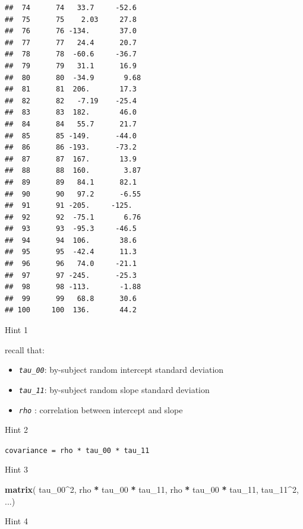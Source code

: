 \documentclass[]{book}
\newenvironment{Shaded}{\begin{snugshade}}{\end{snugshade}}
\newcommand{\DataTypeTok}[1]{\textcolor[rgb]{0.13,0.29,0.53}{#1}}
\newcommand{\DecValTok}[1]{\textcolor[rgb]{0.00,0.00,0.81}{#1}}
\newcommand{\KeywordTok}[1]{\textcolor[rgb]{0.13,0.29,0.53}{\textbf{#1}}}
\newcommand{\NormalTok}[1]{#1}
\newcommand{\OperatorTok}[1]{\textcolor[rgb]{0.81,0.36,0.00}{\textbf{#1}}}
\newcommand{\StringTok}[1]{\textcolor[rgb]{0.31,0.60,0.02}{#1}}
\providecommand{\tightlist}{%
  \setlength{\itemsep}{0pt}\setlength{\parskip}{0pt}}
\begin{document}
\begin{verbatim}
##  74      74   33.7     -52.6  
##  75      75    2.03     27.8  
##  76      76 -134.       37.0  
##  77      77   24.4      20.7  
##  78      78  -60.6     -36.7  
##  79      79   31.1      16.9  
##  80      80  -34.9       9.68 
##  81      81  206.       17.3  
##  82      82   -7.19    -25.4  
##  83      83  182.       46.0  
##  84      84   55.7      21.7  
##  85      85 -149.      -44.0  
##  86      86 -193.      -73.2  
##  87      87  167.       13.9  
##  88      88  160.        3.87 
##  89      89   84.1      82.1  
##  90      90   97.2      -6.55 
##  91      91 -205.     -125.   
##  92      92  -75.1       6.76 
##  93      93  -95.3     -46.5  
##  94      94  106.       38.6  
##  95      95  -42.4      11.3  
##  96      96   74.0     -21.1  
##  97      97 -245.      -25.3  
##  98      98 -113.       -1.88 
##  99      99   68.8      30.6  
## 100     100  136.       44.2
\end{verbatim}

Hint 1

recall that:

\begin{itemize}
\tightlist
\item
  \emph{\texttt{tau\_00}}: by-subject random intercept standard deviation
\item
  \emph{\texttt{tau\_11}}: by-subject random slope standard deviation
\item
  \emph{\texttt{rho}} : correlation between intercept and slope
\end{itemize}

Hint 2

\texttt{covariance\ =\ rho\ *\ tau\_00\ *\ tau\_11}

Hint 3

\begin{Shaded}
\begin{Highlighting}[]
\KeywordTok{matrix}\NormalTok{(    tau_}\DecValTok{00}\OperatorTok{^}\DecValTok{2}\NormalTok{,            rho }\OperatorTok{*}\StringTok{ }\NormalTok{tau_}\DecValTok{00} \OperatorTok{*}\StringTok{ }\NormalTok{tau_}\DecValTok{11}\NormalTok{,}
\NormalTok{        rho }\OperatorTok{*}\StringTok{ }\NormalTok{tau_}\DecValTok{00} \OperatorTok{*}\StringTok{ }\NormalTok{tau_}\DecValTok{11}\NormalTok{,      tau_}\DecValTok{11}\OperatorTok{^}\DecValTok{2}\NormalTok{, ...)}
\end{Highlighting}
\end{Shaded}

Hint 4

\begin{Shaded}
\end{Shaded}
\end{document}

